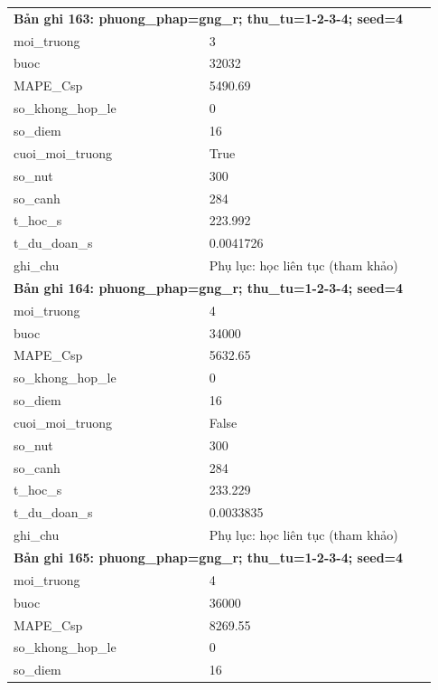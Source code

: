 \begin{longtable}{p{0.43\linewidth}p{0.50\linewidth}}
\midrule
\multicolumn{2}{p{0.95\linewidth}}{\textbf{Bản ghi 163: phuong\_phap=gng\_r; thu\_tu=1-2-3-4; seed=4}} \\
moi\_\allowbreak truong & 3 \\
buoc & 32032 \\
MAPE\_\allowbreak Csp & 5490.69 \\
so\_\allowbreak khong\_\allowbreak hop\_\allowbreak le & 0 \\
so\_\allowbreak diem & 16 \\
cuoi\_\allowbreak moi\_\allowbreak truong & True \\
so\_\allowbreak nut & 300 \\
so\_\allowbreak canh & 284 \\
t\_\allowbreak hoc\_\allowbreak s & 223.992 \\
t\_\allowbreak du\_\allowbreak doan\_\allowbreak s & 0.0041726 \\
ghi\_\allowbreak chu & Phụ lục: học liên tục (tham khảo) \\
\midrule
\multicolumn{2}{p{0.95\linewidth}}{\textbf{Bản ghi 164: phuong\_phap=gng\_r; thu\_tu=1-2-3-4; seed=4}} \\
moi\_\allowbreak truong & 4 \\
buoc & 34000 \\
MAPE\_\allowbreak Csp & 5632.65 \\
so\_\allowbreak khong\_\allowbreak hop\_\allowbreak le & 0 \\
so\_\allowbreak diem & 16 \\
cuoi\_\allowbreak moi\_\allowbreak truong & False \\
so\_\allowbreak nut & 300 \\
so\_\allowbreak canh & 284 \\
t\_\allowbreak hoc\_\allowbreak s & 233.229 \\
t\_\allowbreak du\_\allowbreak doan\_\allowbreak s & 0.0033835 \\
ghi\_\allowbreak chu & Phụ lục: học liên tục (tham khảo) \\
\midrule
\multicolumn{2}{p{0.95\linewidth}}{\textbf{Bản ghi 165: phuong\_phap=gng\_r; thu\_tu=1-2-3-4; seed=4}} \\
moi\_\allowbreak truong & 4 \\
buoc & 36000 \\
MAPE\_\allowbreak Csp & 8269.55 \\
so\_\allowbreak khong\_\allowbreak hop\_\allowbreak le & 0 \\
so\_\allowbreak diem & 16 \\

\end{longtable}
